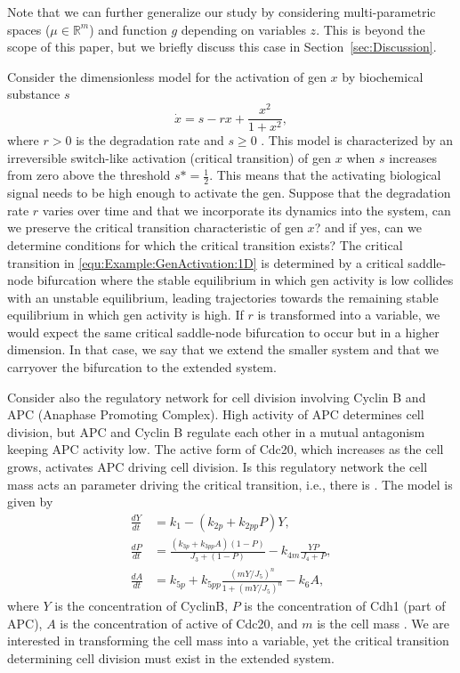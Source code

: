 \documentclass[12pt]{article}
\begin{document}
Note that we can further generalize our study by considering multi-parametric spaces ($\mu \in \mathbb{R}^{m}$) and function $g$ depending on variables $z$. This is beyond the scope of this paper, but we briefly discuss this case in Section~\ref{sec:Discussion}.

Consider the dimensionless model for the activation of gen $x$ by biochemical substance $s$
\begin{equation}
    \dot x = s - rx + \frac{x^{2}}{1+x^{2}},
    \label{equ:Example:GenActivation:1D}
\end{equation}
where $r>0$ is the degradation rate and $s\geq0$ \citep{Strogatz1994, Lewis1977}. This model is characterized by an irreversible switch-like activation (critical transition) of gen $x$ when $s$ increases from zero above the threshold $s*=\frac{1}{2}$. This means that the activating biological signal needs to be high enough to activate the gen. Suppose that the degradation rate $r$ varies over time and that we incorporate its dynamics into the system, can we preserve the critical transition characteristic of gen $x$? and if yes, can we determine conditions for which the critical transition exists? The critical transition in \eqref{equ:Example:GenActivation:1D} is determined by a critical saddle-node bifurcation where the stable equilibrium in which gen activity is low collides with an unstable equilibrium, leading trajectories towards the remaining stable equilibrium in which gen activity is high. If $r$ is transformed into a variable, we would expect the same critical saddle-node bifurcation to occur but in a higher dimension. In that case, we say that we extend the smaller system and that we carryover the bifurcation to the extended system. 

Consider also the regulatory network for cell division involving Cyclin B and APC (Anaphase Promoting Complex). High activity of APC determines cell division, but APC and Cyclin B regulate each other in a mutual antagonism keeping APC activity low. The active form of Cdc20, which increases as the cell grows, activates APC driving cell division. Is this regulatory network the cell mass acts an parameter driving the critical transition, i.e., there is . The model is given by
\begin{equation}
    \begin{aligned}
        \frac{dY}{dt} &= k_{1} - (k_{2p} + k_{2pp}P)Y, \\
        \frac{dP}{dt} &= \frac{(k_{3p}+k_{3pp}A)(1-P)}{J_{3}+(1-P)} - k_{4m}\frac{YP}{J_{4}+P}, \\
        \frac{dA}{dt} &= k_{5p} + k_{5pp}\frac{(mY/J_{5})^{n}}{1+(mY/J_{5})^{n}} - k_{6}A,
    \end{aligned}
    \label{equ:Example:CyclinActivation:1D}
\end{equation}
where $Y$ is the concentration of CyclinB, $P$ is the concentration of Cdh1 (part of APC), $A$ is the concentration of active of Cdc20, and $m$ is the cell mass \citep{Segel2013,Tyson2001}. We are interested in transforming the cell mass into a variable, yet the critical transition determining cell division must exist in the extended system.
\end{document}
